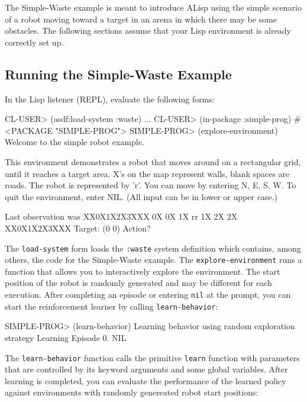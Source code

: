 \documentclass[a4paper]{amsart}
\begin{document}
The Simple-Waste example is meant to introduce ALisp using the simple
scenario of a robot moving toward a target in an arena in which there
may be some obstacles.  The following sections assume that your Lisp
environment is already correctly set up.

\subsection{Running the Simple-Waste Example}
\label{sec:running-simple-waste}

In the Lisp listener (REPL), evaluate the following forms:
\begin{Code}
  CL-USER> (asdf:load-system :waste)
  \lsq...\rsq
  CL-USER> (in-package :simple-prog)
  #<PACKAGE "SIMPLE-PROG">
  SIMPLE-PROG> (explore-environment)
  Welcome to the simple robot example.

  This environment demonstrates a robot that moves around on a
  rectangular grid, until it reaches a target area.  X's on the map
  represent walls, blank spaces are roads.  The robot is represented
  by 'r'.  You can move by entering N, E, S, W.  To quit the
  environment, enter NIL.  (All input can be in lower or upper case.)

  Last observation was 
  XX0X1X2X3XXX
  0X        0X
  1X  rr    1X
  2X        2X
  XX0X1X2X3XXX
  Target: (0 0)
  Action?
\end{Code}
The \texttt{load-system} form loads the \texttt{:waste} system
definition which contains, among others, the code for the Simple-Waste
example.  The \texttt{explore-environment} runs a function that allows
you to interactively explore the environment.  The start position of
the robot is randomly generated and may be different for each
execution.  After completing an episode or entering \texttt{nil} at
the prompt, you can start the reinforcement learner by calling
\texttt{learn-behavior}:
\begin{Code}
  SIMPLE-PROG> (learn-behavior)
  Learning behavior using random exploration strategy
  Learning
  Episode 0.
  NIL
\end{Code}
The \texttt{learn-behavior} function calls the primitive
\texttt{learn} function with parameters that are controlled by its
keyword arguments and some global variables.  After learning is
completed, you can evaluate the performance of the learned policy
against environments with randomly genereated robot start positions:
\end{document}
